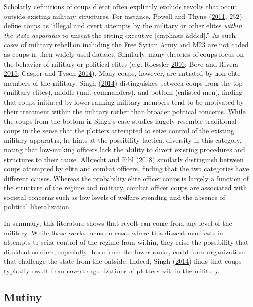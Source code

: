 \documentclass[12pt,]{article}
\begin{document}
Scholarly definitions of coups d'état often explicitly exclude revolts that occur outside existing military structures. For instance, Powell and Thyne (\protect\hyperlink{ref-Powell2011}{2011}, 252) define coups as ``illegal and overt attempts by the military or other elites \emph{within the state apparatus} to unseat the sitting executive {[}emphasis added{]}.'' As such, cases of military rebellion including the Free Syrian Army and M23 are not coded as coups in their widely-used dataset. Similarly, many theories of coups focus on the behavior of military or political elites (e.g. Roessler \protect\hyperlink{ref-Roessler2016}{2016}; Bove and Rivera \protect\hyperlink{ref-Bove2015a}{2015}; Casper and Tyson \protect\hyperlink{ref-Casper2014}{2014}). Many coups, however, are initiated by non-elite members of the military. Singh (\protect\hyperlink{ref-Singh2014}{2014}) distinguishes between coups from the top (military elites), middle (unit commanders), and bottom (enlisted men), finding that coups initiated by lower-ranking military members tend to be motivated by their treatment within the military rather than broader political concerns. While the coups from the bottom in Singh's case studies largely resemble traditional coups in the sense that the plotters attempted to seize control of the existing military apparatus, he hints at the possibility tactical diversity in this category, noting that low-ranking officers lack the ability to divert existing procedures and structures to their cause. Albrecht and Eibl (\protect\hyperlink{ref-Albrecht2018a}{2018}) similarly distinguish between coups attempted by elite and combat officers, finding that the two categories have different causes. Whereas the probability elite officer coups is largely a function of the structure of the regime and military, combat officer coups are associated with societal concerns such as low levels of welfare spending and the absence of political liberalization.

In summary, this literature shows that revolt can come from any level of the military. While these works focus on cases where this dissent manifests in attempts to seize control of the regime from within, they raise the possibility that dissident soldiers, especially those from the lower ranks, could form organizations that challenge the state from the outside. Indeed, Singh (\protect\hyperlink{ref-Singh2014}{2014}) finds that coups typically result from covert organizations of plotters within the military.

\hypertarget{mutiny}{%
\subsection{Mutiny}\label{mutiny}}
\end{document}

